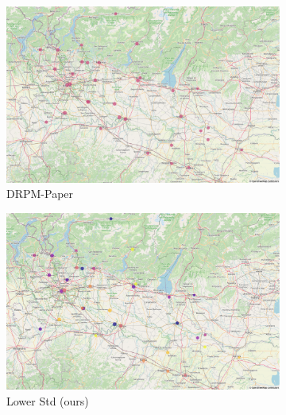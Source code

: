 \documentclass[12pt,a4paper]{article}
\begin{document}
\begin{figure}
     \centering
     \begin{subfigure}[b]{0.49\textwidth}
         \centering
         \includegraphics[width=\textwidth]{./imgs/drpm_base_clustering_paper_params.png}
         \caption{DRPM-Paper \cite{Page2021-Temporal}}
         \label{fig:DRPMclusteringPaper}
     \end{subfigure}
     \hfill
     \begin{subfigure}[b]{0.49\textwidth}
         \centering
         \includegraphics[width=\textwidth]{./imgs/drpm_base_clustering_lower_std.png}
         \caption{Lower Std (ours)}
         \label{fig:DRPMClusteringLowerStd}
     \end{subfigure}
     \hfill
     \begin{subfigure}[b]{0.49\textwidth}
         \centering

\end{subfigure}
\end{figure}
\end{document}
